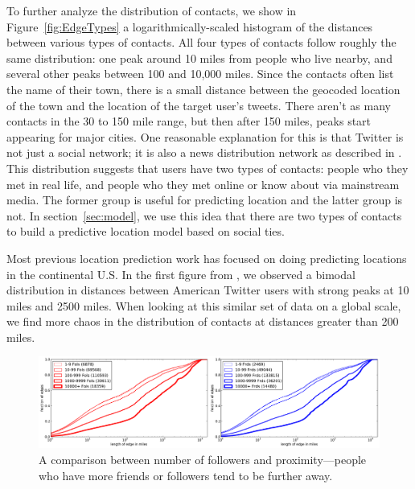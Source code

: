 To further analyze the distribution of contacts, we show in
Figure~\ref{fig:EdgeTypes} a logarithmically-scaled
histogram of the distances between various types of contacts.
%
All four types of contacts follow roughly the same
distribution: one peak around 10 miles from people who live nearby, and several
other peaks between 100 and 10,000 miles.
%
Since the contacts often list the name of their town, there is a small distance
between the geocoded location of the town and the location of the target
user's tweets.
%
There aren't as many contacts in the 30 to 150 mile range, but then after 150
miles, peaks start appearing for major cities.
%
One reasonable explanation for this is that Twitter is not just a social
network; it is also a news distribution network as described in
\cite{kwak2010why}.
%
This distribution suggests that users have two types of contacts: people who
they met in real life, and people who they met online or know about via
mainstream media.
%
The former group is useful for predicting location and the latter group is not.
%
In section~\ref{sec:model}, we use this idea that there are two types of
contacts to build a predictive location model based on social ties.


Most previous location prediction work has focused on doing predicting
locations in the continental U.S.
%
In the first figure from \cite{mcgee2011geographic}, we observed a
bimodal distribution in distances between American Twitter users with strong
peaks at 10 miles and 2500 miles.
%
When looking at this similar set of data on a global scale, we find more chaos
in the distribution of contacts at distances greater than 200 miles.

\begin{figure}[tbh]
\centering
\includegraphics[width=\linewidth]{figures/edge_counts.pdf}
\caption{
A comparison between number of followers and proximity---people who have more
friends or followers tend to be further away.
}
\label{fig:EdgeCounts}
\end{figure}



